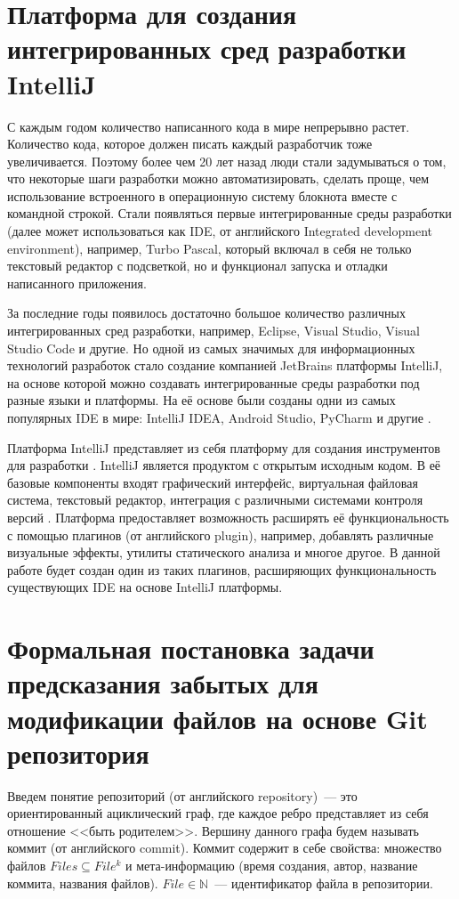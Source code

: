 \section{Платформа для создания интегрированных сред разработки IntelliJ}
С каждым годом количество написанного кода в мире непрерывно растет. Количество кода, которое должен писать каждый разработчик тоже увеличивается. Поэтому более чем 20 лет назад люди стали задумываться о том, что некоторые шаги разработки можно автоматизировать, сделать проще, чем использование встроенного в операционную систему блокнота вместе с командной строкой. Стали появляться первые интегрированные среды разработки (далее может использоваться как IDE, от английского Integrated development environment), например, Turbo Pascal, который включал в себя не только текстовый редактор с подсветкой, но и функционал запуска и отладки написанного приложения.

За последние годы появилось достаточно большое количество различных интегрированных сред разработки, например, Eclipse, Visual Studio, Visual Studio Code и другие. Но одной из самых значимых для информационных технологий разработок стало создание компанией JetBrains платформы IntelliJ, на основе которой можно создавать интегрированные среды разработки под разные языки и платформы. На её основе были созданы одни из самых популярных IDE в мире: IntelliJ IDEA, Android Studio, PyCharm и другие \cite{top-ide}.

Платформа IntelliJ представляет из себя платформу для создания инструментов для разработки \cite{intellij-top}. IntelliJ является продуктом с открытым исходным кодом. В её базовые компоненты входят графический интерфейс, виртуальная файловая система, текстовый редактор, интеграция с различными системами контроля версий \cite{intellij-top}. Платформа предоставляет возможность расширять её функциональность с помощью плагинов (от английского plugin), например, добавлять различные визуальные эффекты, утилиты статического анализа и многое другое. В данной работе будет создан один из таких плагинов, расширяющих функциональность существующих IDE на основе IntelliJ платформы.


\section{Формальная постановка задачи предсказания забытых для модификации файлов на основе Git репозитория}\label{requirements}
Введем понятие репозиторий (от английского repository)~--- это ориентированный ациклический граф, где каждое ребро представляет из себя отношение <<быть родителем>>. Вершину данного графа будем называть коммит (от английского commit). Коммит содержит в себе свойства: множество файлов $Files \subseteq File^k$ и мета-информацию (время создания, автор, название коммита, названия файлов). $File \in \mathbb{N}$~--- идентификатор файла в репозитории.\\
